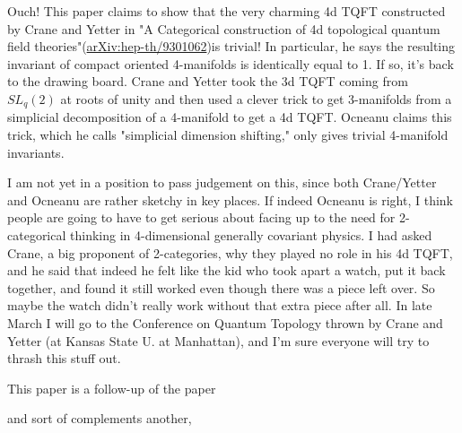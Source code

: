 
Ouch! This paper claims to show that the very charming 4d TQFT constructed by Crane and Yetter in "A Categorical construction of 4d topological quantum field theories"(\href{https://arxiv.org/abs/hep-th/9301062}{arXiv:hep-th/9301062})is trivial! In particular, he says the resulting invariant of compact oriented 4-manifolds is identically equal to 1. If so, it's back to the drawing board. Crane and Yetter took the 3d TQFT coming from $SL_q(2)$ at roots of unity and then used a clever trick to get 3-manifolds from a simplicial decomposition of a 4-manifold to get a 4d TQFT. Ocneanu claims this trick, which he calls "simplicial dimension shifting," only gives trivial 4-manifold invariants.

I am not yet in a position to pass judgement on this, since both Crane/Yetter and Ocneanu are rather sketchy in key places. If indeed Ocneanu is right, I think people are going to have to get serious about facing up to the need for 2-categorical thinking in 4-dimensional generally covariant physics. I had asked Crane, a big proponent of 2-categories, why they played no role in his 4d TQFT, and he said that indeed he felt like the kid who took apart a watch, put it back together, and found it still worked even though there was a piece left over. So maybe the watch didn't really work without that extra piece after all. In late March I will go to the Conference on Quantum Topology thrown by Crane and Yetter (at Kansas State U. at Manhattan), and I'm sure everyone will try to thrash this stuff out.


This paper is a follow-up of the paper


and sort of complements another,


